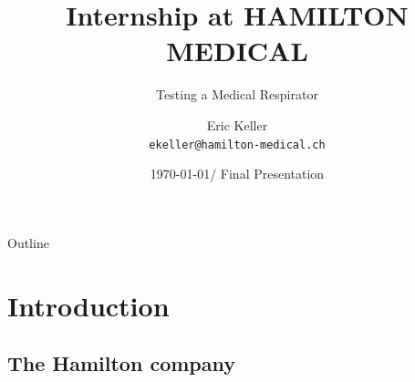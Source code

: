 \documentclass{beamer}
\title[HamMedIntern] %
{Internship at HAMILTON MEDICAL}
\subtitle
{Testing a Medical Respirator} %
\author[ekeller]{Eric Keller\\ \texttt{ekeller@hamilton-medical.ch}}
\institute[Universities of Somewhere and Elsewhere] %
{
  EPITA \\
  (Ecole Pour l'Informatique et les Techniques Avancees)
}
\date
{\today / Final Presentation}
\begin{document}
\begin{frame}
  \titlepage
\end{frame}

\begin{frame}{Outline}
  \tableofcontents
\end{frame}




\section{Introduction}

\subsection[Hamilton]{The Hamilton company}
\end{document}
